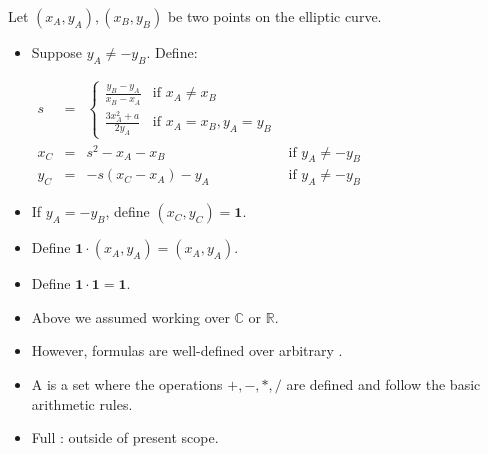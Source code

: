 \begin{frame}
\vskip -0.15cm
\begin{emptyTheorem}
Let $\left(x_A, y_A\right), \left(x_B, y_B\right)$ be two points on the elliptic curve. 
\begin{itemize}
\item Suppose $y_A\neq -y_B$. Define:

$\begin{array}{rcl|l}
s&=& \left\{ \begin{array}{ll}\displaystyle\frac{y_B-y_A}{x_B-x_A} &\displaystyle\text{if } x_A\neq x_B \\\displaystyle \frac{3x_A^2+a}{2y_A}&\text{if }x_A=x_B, y_A=y_B \end{array} \right.\\
x_C &=& s^2 - x_A-x_B &\text{if } y_A\neq -y_B\\
y_C &=& -s(x_C-x_A)-y_A&\text{if } y_A\neq -y_B 
\end{array}
$
\item If $y_A= -y_B$, define $(x_C, y_C) = \mathbf 1$.
\item Define $\mathbf 1\cdot \left(x_A, y_A\right) = \left(x_A,y_A\right)$.
\item Define $\mathbf 1\cdot \mathbf 1 = \mathbf 1$.

\end{itemize}
\end{emptyTheorem}

\begin{itemize}
\item<2-> Above we assumed working over $\mathbb C$ or $\mathbb R$.
\item<3-> However, formulas are well-defined over arbitrary . 
\item<4-> A  is a set where the operations  $+, -, *, /$ are defined  and follow the basic arithmetic rules.
\item<5->  Full : outside of present scope.
\end{itemize}
\end{frame}